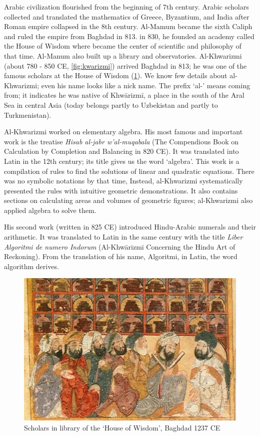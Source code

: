 \documentclass[b5paper]{article}
\begin{document}
\begin{mdframed}
 \label{sec:Khwarizmi}
Arabic civilization flourished from the beginning of 7th century. Arabic scholars collected and translated the mathematics of Greece, Byzantium, and India after Roman empire collapsed in the 8th century. Al-Mamum became the sixth Caliph and ruled the empire from Baghdad in 813. in 830, he founded an academy called the House of Wisdom where became the center of scientific and philosophy of that time. Al-Manum also built up a library and observatories. Al-Khwarizmi (about 780 - 850 CE, \cref{fig:kwarizmi}) arrived Baghdad in 813; he was one of the famous scholars at the House of Wisdom (\cref{fig:HoW}). We know few details about al-Khwarizmi; even his name looks like a nick name. The prefix `al-' means coming from; it indicates he was native of Khwārizmī, a place in the south of the Aral Sea in central Asia (today belongs partly to Uzbekistan and partly to Turkmenistan).

Al-Khwarizmi worked on elementary algebra. His most famous and important work is the treatise {\em Hisab al-jabr w'al-muqabala} (The Compendious Book on Calculation by Completion and Balancing in 820 CE). It was translated into Latin in the 12th century; its title gives us the word `algebra'. This work is a compilation of rules to find the solutions of linear and quadratic equations. There was no symbolic notations by that time, Instead, al-Khwarizmi systematically presented the rules with intuitive geometric demonstrations. It also contains sections on calculating areas and volumes of geometric figures; al-Khwarizmi also applied algebra to solve them.

His second work (written in 825 CE) introduced Hindu-Arabic numerals and their arithmetic. It was translated to Latin in the same century with the title {\em Liber Algoritmi de numero Indorum} (Al-Khwārizmī Concerning the Hindu Art of Reckoning). From the translation of his name, Algoritmi, in Latin, the word algorithm derives\cite{Britannica-25}.
\end{mdframed}

\begin{figure}[htbp]
 \centering
 \includegraphics[scale=0.3]{img/HoW}
 \caption{Scholars in library of the `House of Wisdom', Baghdad 1237 CE}
 \label{fig:HoW}
\end{figure}
\end{document}
